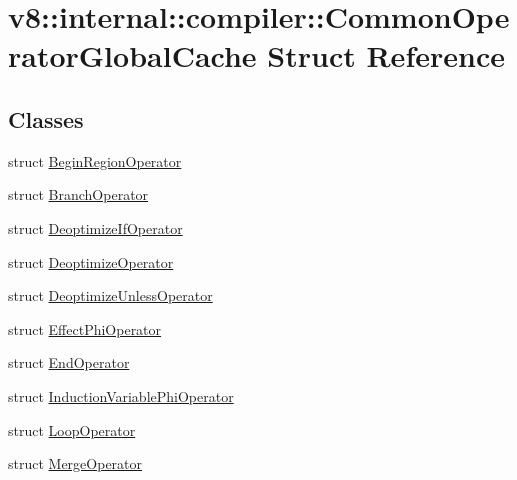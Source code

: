\hypertarget{structv8_1_1internal_1_1compiler_1_1CommonOperatorGlobalCache}{}\section{v8\+:\+:internal\+:\+:compiler\+:\+:Common\+Operator\+Global\+Cache Struct Reference}
\label{structv8_1_1internal_1_1compiler_1_1CommonOperatorGlobalCache}
\subsection*{Classes}
\begin{DoxyCompactItemize}
\item 
struct \mbox{\hyperlink{structv8_1_1internal_1_1compiler_1_1CommonOperatorGlobalCache_1_1BeginRegionOperator}{Begin\+Region\+Operator}}
\item 
struct \mbox{\hyperlink{structv8_1_1internal_1_1compiler_1_1CommonOperatorGlobalCache_1_1BranchOperator}{Branch\+Operator}}
\item 
struct \mbox{\hyperlink{structv8_1_1internal_1_1compiler_1_1CommonOperatorGlobalCache_1_1DeoptimizeIfOperator}{Deoptimize\+If\+Operator}}
\item 
struct \mbox{\hyperlink{structv8_1_1internal_1_1compiler_1_1CommonOperatorGlobalCache_1_1DeoptimizeOperator}{Deoptimize\+Operator}}
\item 
struct \mbox{\hyperlink{structv8_1_1internal_1_1compiler_1_1CommonOperatorGlobalCache_1_1DeoptimizeUnlessOperator}{Deoptimize\+Unless\+Operator}}
\item 
struct \mbox{\hyperlink{structv8_1_1internal_1_1compiler_1_1CommonOperatorGlobalCache_1_1EffectPhiOperator}{Effect\+Phi\+Operator}}
\item 
struct \mbox{\hyperlink{structv8_1_1internal_1_1compiler_1_1CommonOperatorGlobalCache_1_1EndOperator}{End\+Operator}}
\item 
struct \mbox{\hyperlink{structv8_1_1internal_1_1compiler_1_1CommonOperatorGlobalCache_1_1InductionVariablePhiOperator}{Induction\+Variable\+Phi\+Operator}}
\item 
struct \mbox{\hyperlink{structv8_1_1internal_1_1compiler_1_1CommonOperatorGlobalCache_1_1LoopOperator}{Loop\+Operator}}
\item 
struct \mbox{\hyperlink{structv8_1_1internal_1_1compiler_1_1CommonOperatorGlobalCache_1_1MergeOperator}{Merge\+Operator}}
\item 

\end{DoxyCompactItemize}
